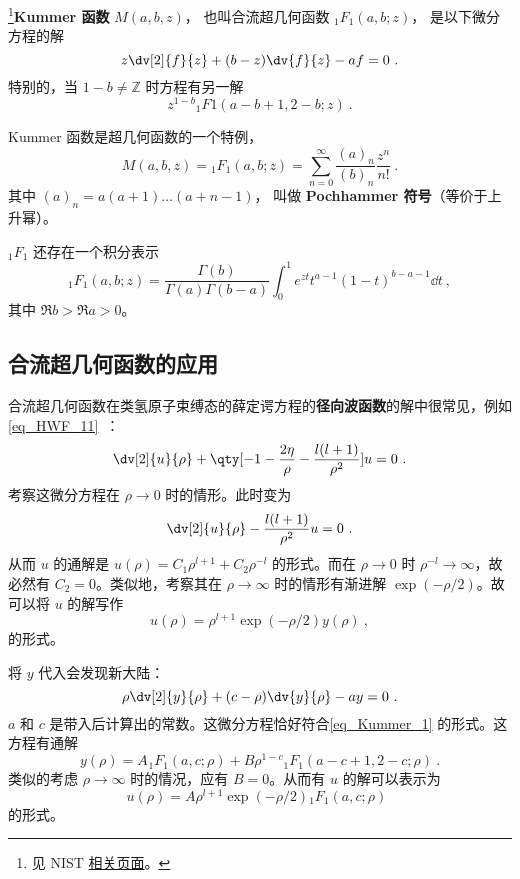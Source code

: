
\begin{issues}
\issueDraft
\end{issues}

\footnote{见 NIST \href{https://dlmf.nist.gov/13.2}{相关页面}。}\textbf{Kummer 函数} $M(a, b, z)$， 也叫合流超几何函数 $_1F_1(a, b; z)$， 是以下微分方程的解
\begin{equation}\label{eq_Kummer_1}
z\dv[2]{f}{z} + (b-z)\dv{f}{z} - a f = 0~.
\end{equation}
特别的，当 $1 - b \neq \mathbb Z$ 时方程有另一解
$$z^{1-b} {_1F1}(a-b+1, 2-b; z)~.$$

Kummer 函数是超几何函数的一个特例， 
\begin{equation}
M(a, b, z) = {_1F_1}(a, b; z) = \sum_{n=0}^\infty \frac{(a)_n}{(b)_n} \frac{z^n}{n!}~.
\end{equation}
其中 $(a)_n = a(a+1)\dots(a+n-1)$， 叫做 \textbf{Pochhammer 符号}（等价于上升幂）。

${_1F_1}$ 还存在一个积分表示
\begin{equation}
{_1F_1}(a, b; z) = \frac{\Gamma(b)}{\Gamma(a) \Gamma(b-a)} \int_0^1 {e^{zt} t^{a-1} (1-t)^{b-a-1}\dd t} ~,
\end{equation}
其中 $\Re b > \Re a > 0$。

\subsection{合流超几何函数的应用}
合流超几何函数在类氢原子束缚态的薛定谔方程的\textbf{径向波函数}的解中很常见，例如\autoref{eq_HWF_11}~：
\begin{equation}
\dv[2]{u}{\rho} + \qty[-1 - \frac{2\eta}{\rho} - \frac{l(l+1)}{\rho^2}]u = 0~.
\end{equation}
考察这微分方程在 $\rho \rightarrow 0$ 时的情形。此时变为
\begin{equation}
\dv[2]{u}{\rho} - \frac{l(l+1)}{\rho^2} u = 0 ~.
\end{equation}
从而 $u$ 的通解是 $u(\rho) = C_1 \rho^{l+1} + C_2 \rho^{-l}$ 的形式。而在 $\rho \rightarrow 0$ 时 $\rho^{-l} \rightarrow \infty$，故必然有 $C_2 = 0$。类似地，考察其在 $\rho \rightarrow \infty$ 时的情形有渐进解 $\exp(-\rho/2)$。故可以将 $u$ 的解写作
\begin{equation}
u(\rho) = \rho^{l+1} \exp(-\rho/2) y(\rho) ~,
\end{equation}
的形式。

将 $y$ 代入会发现新大陆：
\begin{equation}
\rho \dv[2]{y}{\rho} + (c-\rho)\dv{y}{\rho} -ay = 0 ~.
\end{equation}
$a$ 和 $c$ 是带入后计算出的常数。这微分方程恰好符合\autoref{eq_Kummer_1} 的形式。这方程有通解
\begin{equation}
y(\rho) = A_{} {}_{1}F_1(a, c; \rho) + B \rho^{1-c}{}  _{1}F_{1}(a-c+1, 2-c; \rho) ~.
\end{equation}
类似的考虑 $\rho\rightarrow \infty$ 时的情况，应有 $B=0$。从而有 $u$ 的解可以表示为
\begin{equation}
u(\rho) = A \rho^{l+1} \exp(-\rho/2) {_1F_1}(a, c; \rho) ~~
\end{equation}
的形式。
